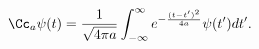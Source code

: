\begin{equation}
\label{con-def} \Cc_a\psi (t)=\frac{1}{\sqrt{4\pi a}}\int
_{-\infty}^{\infty} e^{-\frac{(t-t')^{2}}{4a}} \psi(t')dt'.
\end{equation}

